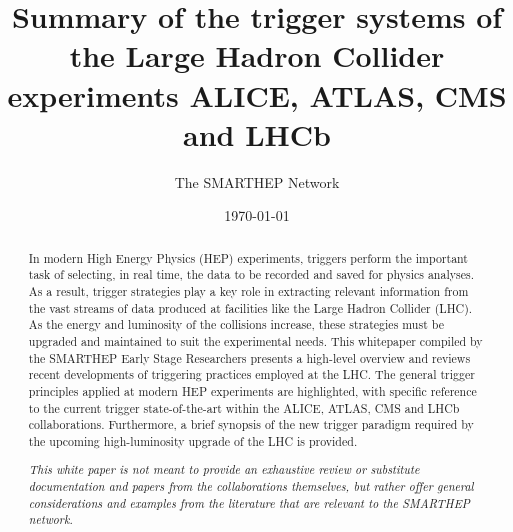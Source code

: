 \documentclass{smarthepnote}
\title{Summary of the trigger systems of the Large Hadron Collider experiments ALICE, ATLAS, CMS and LHCb}
\author{The SMARTHEP Network}
\date{\today}
\begin{document}
\maketitle

\begin{abstract}

In modern High Energy Physics (HEP) experiments, triggers perform the important task of selecting, in real time, the data to be recorded and saved for physics analyses. As a result, trigger strategies play a key role in extracting relevant information from the vast streams of data produced at facilities like the Large Hadron Collider (LHC). As the energy and luminosity of the collisions increase, these strategies must be upgraded and maintained to suit the experimental needs. This whitepaper compiled by the SMARTHEP Early Stage Researchers presents a high-level overview and reviews recent developments of triggering practices employed at the LHC. The general trigger principles applied at modern HEP experiments are highlighted, with specific reference to the current trigger state-of-the-art within the ALICE, ATLAS, CMS and LHCb collaborations. Furthermore, a brief synopsis of the new trigger paradigm required by the upcoming high-luminosity upgrade of the LHC is provided. 

\textit{This white paper is not meant to provide an exhaustive review or substitute documentation and papers from the collaborations themselves, but rather offer general considerations and examples from the literature that are relevant to the SMARTHEP network.} 



\end{abstract}
\end{document}
